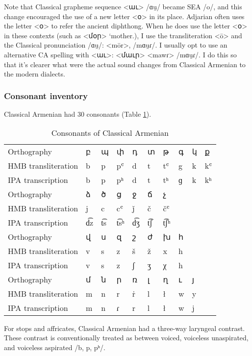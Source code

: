 Note that Classical grapheme sequence <աւ> /ɑu̯/  became SEA /o/, and this change encouraged the use of a new letter <օ> in its place. Adjarian often uses the letter <օ>    to refer the  ancient diphthong. When he does use the letter <օ> in these contexts (such as <մօր> `mother.{\gen}), I use the transliteration <ō> and the Classical pronunciation  /ɑu̯/: <mōr>, /mɑu̯ɾ/. I usually opt to use an alternative CA spelling with <աւ>: <մաւր> <mawɾ> /mɑu̯ɾ/.    I do this so that it's clearer what were the actual sound changes from Classical Armenian to the modern dialects. 


\subsubsection{Consonant inventory}



Classical Armenian had 30 consonants (Table \ref{tab:HossepIntr:classicalConsonant}).  

\begin{table}[H]
	\centering
	\caption{Consonants of Classical Armenian}
	\label{tab:HossepIntr:classicalConsonant}
	\begin{tabular}{|l|lllllllll|}
		\hline 
		Orthography & բ &պ& փ &դ& տ &թ& գ& կ& ք   \\
		HMB transliteration &  b &p& pʿ &d& t &tʿ& g& k& kʿ  \\
		IPA transcription & b &p& pʰ &d& t &tʰ& ɡ& k& kʰ  \\
		\hline 
		Orthography &ձ& ծ& ց &ջ& ճ& չ  & & &  \\
		HMB transliteration &j &c &cʿ& ǰ &č &čʿ & & &   \\
		IPA transcription & d͡z & t͡s & t͡sʰ & d͡ʒ & t͡ʃ & t͡ʃʰ & & & \\
		\hline 
		Orthography & վ & ս&  զ&  շ&  ժ&  խ & հ & & \\
		HMB transliteration & v & s&  z&  š&  ž&  x & h & & \\
		IPA transcription& v & s&  z&  ʃ&  ʒ&  χ & h & & 
		\\          
		\hline
		Orthography & մ &  ն &    ր&  ռ&  լ&  ղ &  ւ & յ &  \\
		HMB transliteration & m & n & r & ṙ&l &   ł & w & y &  \\
		IPA transcription & m & n & ɾ & r& l &  ł & w & j& 
		\\ \hline 
	\end{tabular}
\end{table}

For stops and affricates, Classical Armenian had a three-way laryngeal contrast. These contrast is conventionally treated as between voiced, voiceless unaspirated, and voiceless aspirated /b, p, pʰ/. 

